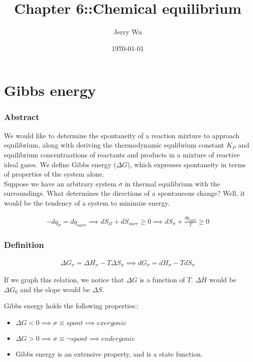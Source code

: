 \documentclass[12pt]{book}
\title{Chapter 6::Chemical equilibrium}
\author{Jerry Wu}
\date{\today}
\begin{document}
\maketitle

\chapter*{Gibbs energy}
\subsection*{Abstract}
We would like to determine the spontaneity of a reaction mixture to approach equilibrium, along with deriving the thermodynamic equlibrium constant $K_P$ and equilibrium concentraations of reactants and products in a mixture of reactive ideal gases. We define Gibbs energy ($\Delta G$), which expresses spontaneity in terms of properties of the system alone.\\

Suppose we have an arbitrary system $\sigma$ in thermal equilibrium with the surroundings. What determines the directions of a spontaneous change? Well, it would be the tendency of a system to minimize energy.

\begin{align*}
    -dq_{\sigma}=dq_{surr}\implies dS_{\Omega}+dS_{surr}\geq 0\implies dS_{\sigma}+\frac{dq_{surr}}{T}\geq 0
\end{align*}

\subsection*{Definition}
\begin{align*}
    \Delta G_{\sigma}=\Delta H_{\sigma}-T\Delta S_{\sigma}\implies dG_{\sigma}=dH_{\sigma}-TdS_{\sigma}
\end{align*}

If we graph this relation, we notice that $\Delta G$ is a function of $T$. $\Delta H$ would be $\Delta G_0$ and the slope would be $\Delta S$.

Gibbs energy holds the following properties::

\begin{itemize}
    \item $\Delta G<0\implies \sigma\equiv spont\implies exergonic$
    \item $\Delta G>0\implies \sigma\equiv \lnot spont\implies endergonic$
    \item Gibbs energy is an extensive property, and is a state function.
\end{itemize}
\end{document}

